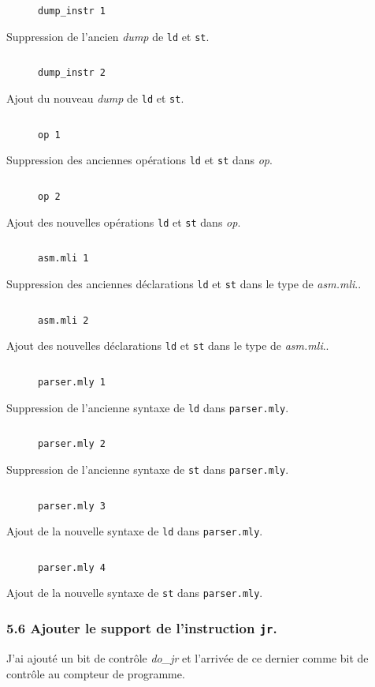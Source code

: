 \documentclass[twoside, 12pt, a4paper]{article}
\newcommand{\fmo}[4]{
\begin{figure}[!h]
    \centering
    \inputminted[firstline=#3, lastline=#4]{ocaml}{#1}
    \caption{\texttt{#2}}
\end{figure}
}
\begin{document}
\fmo{../patch/digcomp_jb.patch.dbu}{dump\_instr 1}{40}{43}

Suppression de l'ancien \textit{dump} de \texttt{ld} et \texttt{st}.

\fmo{../patch/digcomp_jb.patch.dbu}{dump\_instr 2}{48}{51}

Ajout du nouveau \textit{dump} de \texttt{ld} et \texttt{st}.

\clearpage

\fmo{../patch/digcomp_jb.patch.dbu}{op 1}{78}{81}

Suppression des anciennes opérations \texttt{ld} et \texttt{st} dans \textit{op}. 

\fmo{../patch/digcomp_jb.patch.dbu}{op 2}{86}{95}

Ajout des nouvelles opérations \texttt{ld} et \texttt{st} dans \textit{op}.

\fmo{../patch/digcomp_jb.patch.dbu}{asm.mli 1}{118}{119}

Suppression des anciennes déclarations \texttt{ld} et \texttt{st} dans le type de \textit{asm.mli}.. 

\fmo{../patch/digcomp_jb.patch.dbu}{asm.mli 2}{122}{123}

Ajout des nouvelles déclarations \texttt{ld} et \texttt{st} dans le type de \textit{asm.mli}.. 

\fmo{../patch/digcomp_jb.patch.dbu}{parser.mly 1}{194}{194}

Suppression de l'ancienne syntaxe de \texttt{ld} dans \texttt{parser.mly}.

\fmo{../patch/digcomp_jb.patch.dbu}{parser.mly 2}{196}{196}

Suppression de l'ancienne syntaxe de \texttt{st} dans \texttt{parser.mly}.

\clearpage

\fmo{../patch/digcomp_jb.patch.dbu}{parser.mly 3}{200}{200}

Ajout de la nouvelle syntaxe de \texttt{ld} dans \texttt{parser.mly}.

\fmo{../patch/digcomp_jb.patch.dbu}{parser.mly 4}{202}{202}

Ajout de la nouvelle syntaxe de \texttt{st} dans \texttt{parser.mly}.

        \subsubsection*{\textbf{5.6} Ajouter le support de l'instruction \texttt{jr}.}

        J'ai ajouté un bit de contrôle \textit{do\_jr} et l'arrivée de ce dernier comme bit de contrôle au compteur de programme.
\end{document}
